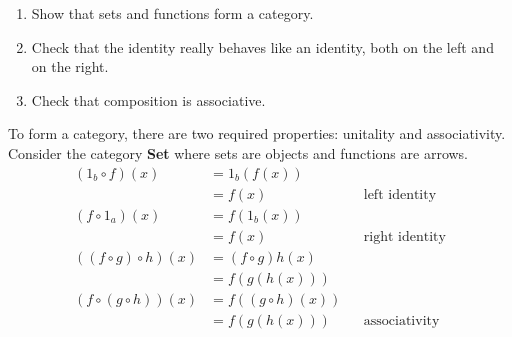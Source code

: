 \begin{ttta}
	\begin{enumerate}[label = {(\alph*)}]
		\item Show that sets and functions form a category.
		\item Check that the identity really behaves like an identity, both on
		      the left and on the right.
		\item Check that composition is
		      associative.\label{ttta:function-forms-category}
	\end{enumerate}
\end{ttta}
To form a category, there are two required properties: unitality and
associativity. Consider the category \textbf{Set} where sets are objects and
functions are arrows.
\begin{align*}
	(1_b \circ f)(x)                    & = 1_b(f(x))        &  &                       \\
	                                    & = f(x)             &  & \text{left identity}  \\
	(f \circ 1_a)(x)                    & = f(1_b(x))        &  &                       \\
	                                    & = f(x)             &  & \text{right identity} \\
	\left((f \circ g) \circ h\right)(x) & = (f \circ g)h(x)  &  & \text{}               \\
	                                    & = f(g(h(x)))       &  & \text{}               \\
	\left(f \circ (g \circ h)\right)(x) & = f((g\circ h)(x))                            \\
	                                    & = f(g(h(x)))       &  & \text{associativity}
\end{align*}

